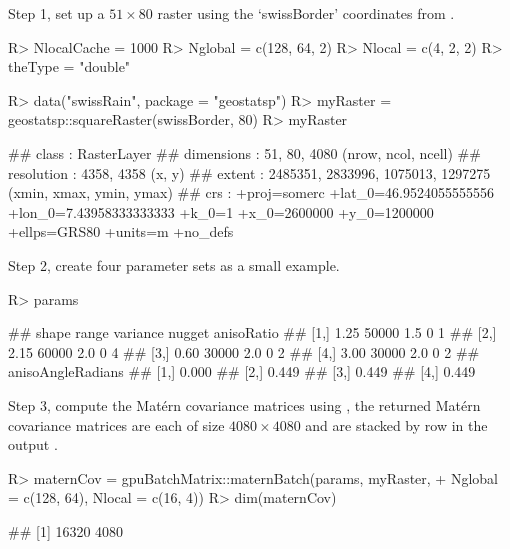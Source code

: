 \documentclass[article,nojss]{jss}\usepackage[]{graphicx}\usepackage[]{color}
\newcommand{\fct}[1]{\code{#1()}}
\begin{document}
Step 1, set up a $51 \times 80$ raster using the `swissBorder' coordinates from .
\begin{CodeChunk}
\begin{CodeInput}
R> NlocalCache = 1000
R> Nglobal = c(128, 64, 2)
R> Nlocal = c(4, 2, 2)
R> theType = "double"
\end{CodeInput} 
\end{CodeChunk} 


\begin{CodeChunk}
\begin{CodeInput}
R> data("swissRain", package = "geostatsp")
R> myRaster = geostatsp::squareRaster(swissBorder, 80)
R> myRaster
\end{CodeInput}
\begin{CodeOutput}
## class      : RasterLayer 
## dimensions : 51, 80, 4080  (nrow, ncol, ncell)
## resolution : 4358, 4358  (x, y)
## extent     : 2485351, 2833996, 1075013, 1297275  (xmin, xmax, ymin, ymax)
## crs        : +proj=somerc +lat_0=46.9524055555556 +lon_0=7.43958333333333 +k_0=1 +x_0=2600000 +y_0=1200000 +ellps=GRS80 +units=m +no_defs
\end{CodeOutput} 
\end{CodeChunk} 

Step 2, create four parameter sets as a small example. 

\begin{CodeChunk}
\begin{CodeInput}
R> params
\end{CodeInput}
\begin{CodeOutput}
##      shape range variance nugget anisoRatio
## [1,]  1.25 50000      1.5      0          1
## [2,]  2.15 60000      2.0      0          4
## [3,]  0.60 30000      2.0      0          2
## [4,]  3.00 30000      2.0      0          2
##      anisoAngleRadians
## [1,]             0.000
## [2,]             0.449
## [3,]             0.449
## [4,]             0.449
\end{CodeOutput} 
\end{CodeChunk} 

Step 3, compute the Mat\'ern covariance matrices using \fct{gpuBatchMatrix::maternBatch}, the returned Mat\'ern covariance matrices %
are each of size $4080 \times 4080$ and are stacked by row in the output . 
\begin{CodeChunk}
\begin{CodeInput}
R> maternCov = gpuBatchMatrix::maternBatch(params, myRaster,
+    Nglobal = c(128, 64), Nlocal = c(16, 4))
R> dim(maternCov)
\end{CodeInput}
\begin{CodeOutput}
## [1] 16320  4080
\end{CodeOutput} 
\end{CodeChunk} 
\end{document}
